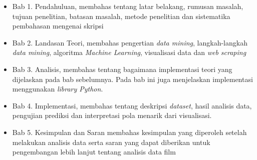 \begin{itemize}
\item Bab 1. Pendahuluan, membahas tentang latar belakang, rumusan masalah, tujuan penelitian, batasan masalah, metode penelitian dan sistematika pembahasan mengenai skripsi

\item Bab 2. Landasan Teori, membahas pengertian \textit{data mining}, langkah-langkah \textit{data mining}, algoritma \textit{Machine Learning}, visualisasi data dan \textit{web scraping}

\item Bab 3. Analisis, membahas tentang bagaimana implementasi teori yang dijelaskan pada bab sebelumnya. Pada bab ini juga menjelaskan implementasi menggunakan \textit{library Python}. 

\item Bab 4. Implementasi, membahas tentang deskripsi \textit{dataset}, hasil analisis data, pengujian prediksi dan interpretasi pola menarik dari visualisasi. 

\item Bab 5. Kesimpulan dan Saran 
membahas kesimpulan yang diperoleh setelah melakukan analisis data serta saran yang dapat diberikan untuk pengembangan lebih lanjut tentang analisis data film 

\end{itemize}

